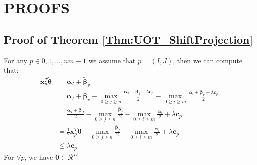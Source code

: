 \documentclass[twoside]{article}
\theoremstyle{plain}
\renewcommand{\vec}[1]{\bm{#1}}
\begin{document}
\clearpage





\clearpage
\appendix

\thispagestyle{empty}


\onecolumn \makesupplementtitle

\section{PROOFS}
\subsection{Proof of Theorem \ref{Thm:UOT_ShiftProjection}}
For any $p \in {0,1,...,nm -1}$ we assume that $p = (I,J)$, then we can compute that:
 \begin{equation}
\begin{split} 
\vec{x}_p^T\tilde{\vec{\theta}} &= \tilde{\vec{\alpha}}_{I} + \tilde{\vec{\beta}}_v \\
				    &= {\vec{\alpha}}_{I} + {\vec{\beta}}_v - \max_{0\geq j\geq n} \frac{{\vec{\alpha}}_u +{\vec{\beta}}_j - \lambda \vec{c}_{p}}{2} - \max_{0 \geq i \geq m} \frac{{\vec{\alpha}}_i +{\vec{\beta}}_v - \lambda \vec{c}_{p}}{2}\\
				    &= \frac{{\vec{\alpha}}_{I} + {\vec{\beta}}_J}{2} - \max_{0\geq j\geq n} \frac{{\vec{\beta}}_j}{2} - \max_{0 \geq i \geq m} \frac{{\vec{\alpha}}_i }{2} + \lambda \vec{c}_{p}\\
				    &= \frac{1}{2}\vec{x}_p^T{\vec{\theta}} - \max_{0\geq j\geq n} \frac{{\vec{\beta}}_j}{2} - \max_{0 \geq i \geq m} \frac{{\vec{\alpha}}_i }{2} +\lambda \vec{c}_{p} \\
				    &\leq \lambda \vec{c}_{p} 
 \end{split} 
\end{equation}
For $\forall p$, we have $\tilde{\vec{\theta}} \in \mathcal{R}^{D}$
\end{document}
